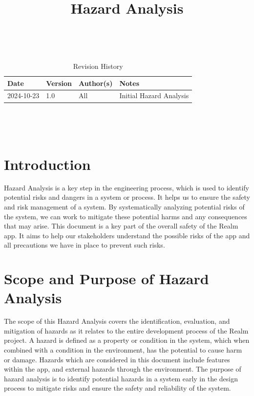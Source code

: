 \documentclass{article}
\title{Hazard Analysis\\\progname}
\author{\authname}
\date{}
\begin{document}
\maketitle
\thispagestyle{empty}

~\newpage


\begin{table}[hp]
    \caption{Revision History} \label{rev_history_table}
    \begin{tabularx}{\textwidth}{p{3cm}p{2cm}p{3cm}X}
        \toprule {\textbf{Date}} & {\textbf{Version}} & {\textbf{Author(s)}} & {\textbf{Notes}} \\
        \midrule
        2024-10-23               & 1.0         & All      & Initial Hazard Analysis      \\
        \bottomrule
    \end{tabularx}
\end{table}

~\newpage

\tableofcontents

~\newpage


\section{Introduction}

Hazard Analysis is a key step in the engineering process, which is used to identify potential risks and dangers in a system or process. It helps us to ensure the safety and risk management of a system. By systematically analyzing potential risks of the system, we can work to mitigate these potential harms and any consequences that may arise. This document is a key part of the overall safety of the Realm app. It aims to help our stakeholders understand the possible risks of the app and all precautions we have in place to prevent such risks.

\section{Scope and Purpose of Hazard Analysis}

The scope of this Hazard Analysis covers the identification, evaluation, and mitigation of hazards as it relates to the entire development process of the Realm project. A hazard is defined as a property or condition in the system, which when combined with a condition in the environment, has the potential to cause harm or damage. Hazards which are considered in this document include features within the app, and external hazards through the environment. The purpose of hazard analysis is to identify potential hazards in a system early in the design process to mitigate risks and ensure the safety and reliability of the system. \\
\end{document}
